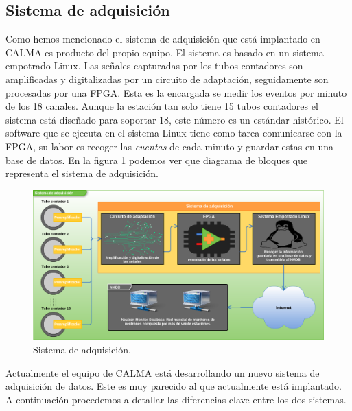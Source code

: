 	\subsection{Sistema de adquisición}
		Como hemos mencionado el sistema de adquisición que está implantado en CALMA es producto del propio equipo\cite{Garcia2014}. El
		sistema es basado en un sistema empotrado Linux. Las señales capturadas por los tubos contadores son amplificadas y digitalizadas por
		un circuito de adaptación, seguidamente son procesadas por una FPGA. Esta es la encargada se medir los eventos por minuto de los 18
		canales. Aunque la  estación tan solo tiene 15 tubos contadores el sistema está diseñado para soportar 18, este número es un estándar
		histórico. El software que se ejecuta en el sistema Linux tiene como tarea comunicarse con la FPGA, su labor es recoger las
		\emph{cuentas} de cada minuto y guardar estas en una base de datos. En la figura \ref{fig:acqsis} podemos ver que diagrama de bloques
		que representa el sistema de adquisición.
		\begin{figure}[h]
			\centering
			\includegraphics[keepaspectratio, width=1\textwidth]{./img/AcqSis.png}
			\caption{Sistema de adquisición.}
			\label{fig:acqsis}
		\end{figure}
		\par
		Actualmente el equipo de CALMA está desarrollando un nuevo sistema de adquisición de datos. Este es muy parecido al que actualmente
		está implantado. A continuación procedemos a detallar las diferencias clave entre los dos sistemas. 
		\par
